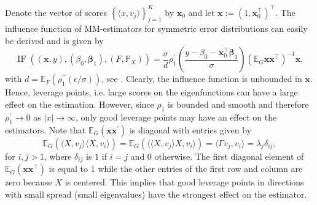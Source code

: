 \documentclass[11pt]{article}
\DeclareMathOperator{\IF}{IF}
\begin{document}
Denote the vector of scores $\left\{ \langle x, v_j \rangle \right\}_{j=1}^K$ by $\mathbf{x}_0$ and let $\mathbf{x} := \left(1, \mathbf{x}_0^{\top} \right)^{\top}$. The influence function of MM-estimators for symmetric error distributions can easily be derived and is given by
\begin{equation}
\label{eq:33}
\IF\left( \left(\mathbf{x}, y \right), \left(\beta_0,\boldsymbol{\beta}_1 \right), \left(F, \mathbb{P}_X \right) \right) = \frac{\sigma}{d} \rho_1^{\prime} \left(\frac{y-\beta_0-\mathbf{x}_0^{\top} \boldsymbol{\beta}_1}{\sigma} \right) \left(\mathbb{E}_G \mathbf{x} \mathbf{x}^{\top} \right)^{-1} \mathbf{x},
\end{equation}
with $d = \mathbb{E}_F (\rho_{1}^{\prime \prime} \left(\epsilon/\sigma \right))$, see \cite{maronna2006robust}. Clearly, the influence function is unbounded in $\mathbf{x}$. Hence, leverage points, i.e. large scores on the eigenfunctions can have a large effect on the estimation. However, since $\rho_{1}$ is bounded and smooth and therefore $\rho_{1}^{\prime} \to 0 $ as $|x|\to \infty $, only good leverage points may have an effect on the estimators.  Note that $\mathbb{E}_G (\mathbf{x} \mathbf{x}^{\prime})$ is diagonal with entries given by
\begin{equation}
\mathbb{E}_G  \left(\langle X, v_j \rangle \langle X, v_i \rangle \right)= \mathbb{E}_G \left( \langle \langle X, v_j \rangle X, v_i \rangle \right) = \langle \Gamma v_j, v_i \rangle = \lambda_j \delta_{ij},
\end{equation}
for $i,j >1$, where $\delta_{ij}$ is $1$ if $i=j$ and $0$ otherwise. The first diagonal element of $\mathbb{E}_G  ( \mathbf{x} \mathbf{x}^{\top} )$ is equal to $1$ while the other entries of the first row and column are zero because $X$ is centered. This implies that good leverage points in directions with small spread (small eigenvalues) have the strongest effect on the estimator.
\end{document}
